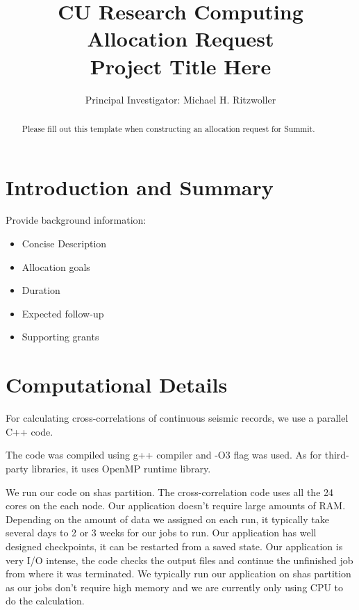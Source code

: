\documentclass[11pt, oneside]{article}
\title{%
\bf{CU Research Computing Allocation Request} \\
\Large Project Title Here
}
\author{Principal Investigator:  Michael H. Ritzwoller}
\date{}							%
\begin{document}
\maketitle
\begin{abstract}
    Please fill out this template when constructing an allocation request for Summit.
\end{abstract}

\section{Introduction and Summary}

Provide background information:
\begin{itemize}
\item Concise Description
\item Allocation goals
\item Duration
\item Expected follow-up
\item Supporting grants
\end{itemize}


\section{Computational Details}

For calculating cross-correlations of continuous seismic records,
we use a parallel C++ code.

The code was compiled using g++ compiler and -O3 flag was used.
As for third-party libraries, it uses OpenMP runtime library.

We run our code on shas partition.
The cross-correlation code uses all the 24 cores on the each node.
Our application doesn't require large amounts of RAM.
Depending on the amount of data we assigned on each run,
it typically take several days to 2 or 3 weeks for our jobs to run.
Our application has well designed checkpoints,
it can be restarted from a saved state.
Our application is very I/O intense,
the code checks the output files and
continue the unfinished job from where it was terminated.
We typically run our application on shas partition
as our jobs don't require high memory and
we are currently only using CPU to do the calculation.
\end{document}
